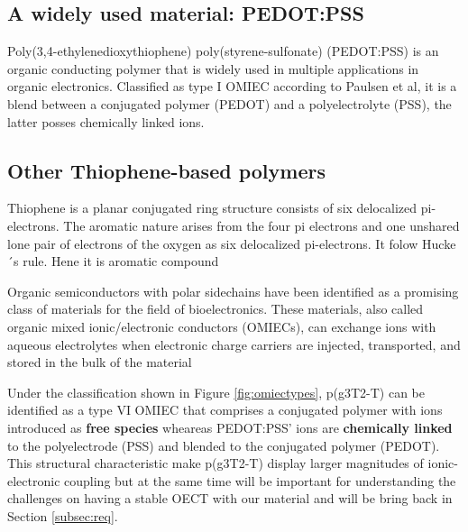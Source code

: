 \subsection{A widely used material: PEDOT:PSS}
Poly(3,4-ethylenedioxythiophene) poly(styrene-sulfonate) (PEDOT:PSS) is an organic conducting polymer that is widely used in multiple applications in organic electronics. Classified as type I OMIEC according to Paulsen et al, it is a blend between a conjugated polymer (PEDOT) and a polyelectrolyte (PSS), the latter posses chemically linked ions.



\subsection{Other Thiophene-based polymers}
Thiophene is a planar conjugated ring structure consists of six delocalized pi-electrons. The aromatic nature arises from the four pi electrons and one unshared lone pair of electrons of the oxygen as six delocalized pi-electrons. It folow Hucke´s rule. Hene it is aromatic compound



Organic semiconductors with polar sidechains have been identified as a promising class of materials for the field of bioelectronics. These materials, also called organic mixed ionic/electronic conductors (OMIECs), can exchange ions with aqueous electrolytes when electronic charge carriers are injected, transported, and stored in the bulk of the material \cite{giovannittiEnergeticControlRedoxActive2020}


Under the classification shown in Figure \ref{fig:omiectypes}, p(g3T2-T) can be identified as a type VI OMIEC that comprises a conjugated polymer with ions introduced as \textbf{free species} wheareas PEDOT:PSS' ions are \textbf{chemically linked} to the polyelectrode (PSS) and blended to the conjugated polymer (PEDOT). This structural characteristic make p(g3T2-T) display larger magnitudes of ionic-electronic coupling but at the same time will be important for understanding the challenges on having a stable OECT with our material and will be bring back in Section \ref{subsec:req}.

